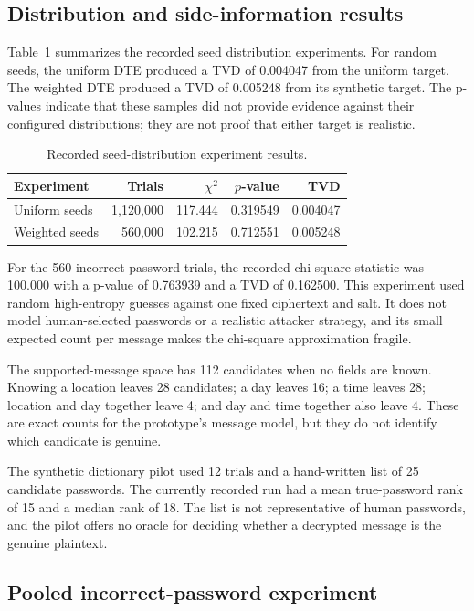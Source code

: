 \documentclass[sigconf,nonacm]{acmart}
\begin{document}
\subsection{Distribution and side-information results}

Table~\ref{tab:distribution-results} summarizes the recorded seed
distribution experiments. For random seeds, the uniform DTE produced a TVD
of 0.004047 from the uniform target. The weighted DTE produced a TVD of
0.005248 from its synthetic target. The p-values indicate that these samples
did not provide evidence against their configured distributions; they are
not proof that either target is realistic.

\begin{table}[t]
  \caption{Recorded seed-distribution experiment results.}
  \label{tab:distribution-results}
  \begin{tabular}{lrrrr}
    \toprule
    Experiment & Trials & $\chi^2$ & $p$-value & TVD \\
    \midrule
    Uniform seeds & 1{,}120{,}000 & 117.444 & 0.319549 & 0.004047 \\
    Weighted seeds & 560{,}000 & 102.215 & 0.712551 & 0.005248 \\
    \bottomrule
  \end{tabular}
\end{table}

For the 560 incorrect-password trials, the recorded chi-square statistic was
100.000 with a p-value of 0.763939 and a TVD of 0.162500. This experiment
used random high-entropy guesses against one fixed ciphertext and salt. It
does not model human-selected passwords or a realistic attacker strategy,
and its small expected count per message makes the chi-square approximation
fragile.

The supported-message space has 112 candidates when no fields are known.
Knowing a location leaves 28 candidates; a day leaves 16; a time leaves 28;
location and day together leave 4; and day and time together also leave 4.
These are exact counts for the prototype's message model, but they do not
identify which candidate is genuine.

The synthetic dictionary pilot used 12 trials and a hand-written list of 25
candidate passwords. The currently recorded run had a mean true-password
rank of 15 and a median rank of 18. The list is not representative of human
passwords, and the pilot offers no oracle for deciding whether a decrypted
message is the genuine plaintext.

\subsection{Pooled incorrect-password experiment}
\end{document}
